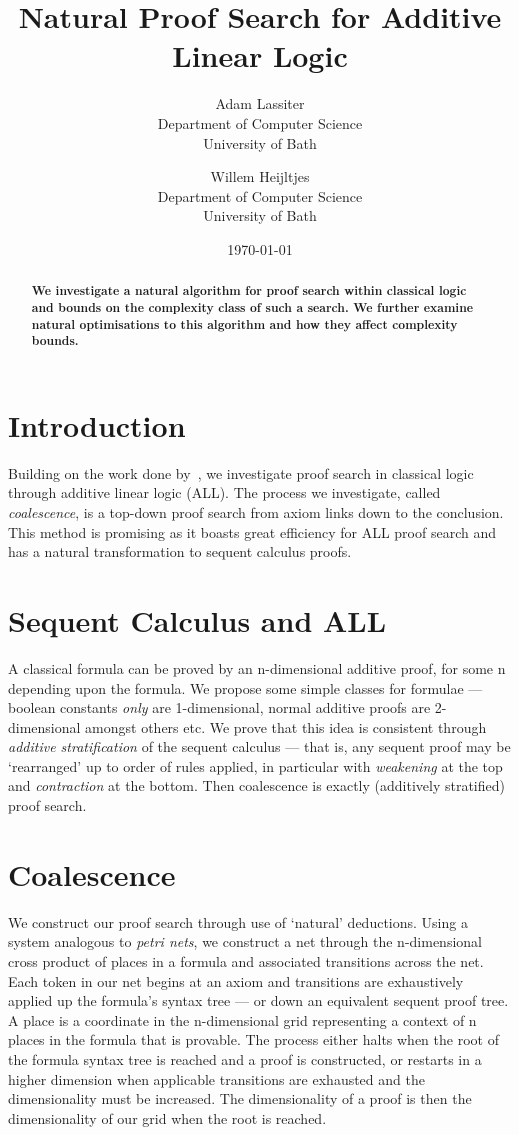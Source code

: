 \documentclass{article}
\title{Natural Proof Search for Additive Linear Logic}
\author{Adam Lassiter\\Department of Computer Science\\University of Bath \and Willem Heijltjes\\Department of Computer Science\\University of Bath}
\date{\today}
\theoremstyle{indented}
\begin{document}
    \maketitle
    \begin{abstract}
        \textbf{
            We investigate a natural algorithm for proof search within classical logic and bounds on the complexity class of such a search.
            We further examine natural optimisations to this algorithm and how they affect complexity bounds.
        }
    \end{abstract}

    \section*{Introduction}
        Building on the work done by~\cite{petri-nets}, we investigate proof search in classical logic through additive linear logic (ALL).
        The process we investigate, called \textit{coalescence}, is a top-down proof search from axiom links down to the conclusion.
        This method is promising as it boasts great efficiency for ALL proof search and has a natural transformation to sequent calculus proofs.

    \section*{Sequent Calculus and ALL}
        A classical formula can be proved by an n-dimensional additive proof, for some n depending upon the formula.
        We propose some simple classes for formulae --- boolean constants \textit{only} are 1-dimensional, normal additive proofs are 2-dimensional amongst others etc.
        We prove that this idea is consistent through \textit{additive stratification} of the sequent calculus --- that is, any sequent proof may be `rearranged' up to order of rules applied, in particular with \textit{weakening} at the top and \textit{contraction} at the bottom.
        Then coalescence is exactly (additively stratified) proof search.

    \section*{Coalescence}
        We construct our proof search through use of `natural' deductions.
        Using a system analogous to \textit{petri nets}, we construct a net through the n-dimensional cross product of places in a formula and associated transitions across the net.
        Each token in our net begins at an axiom and transitions are exhaustively applied up the formula's syntax tree --- or down an equivalent sequent proof tree.
        A place is a coordinate in the n-dimensional grid representing a context of n places in the formula that is provable.
        The process either halts when the root of the formula syntax tree is reached and a proof is constructed, or restarts in a higher dimension when applicable transitions are exhausted and the dimensionality must be increased.
        The dimensionality of a proof is then the dimensionality of our grid when the root is reached.
\end{document}
